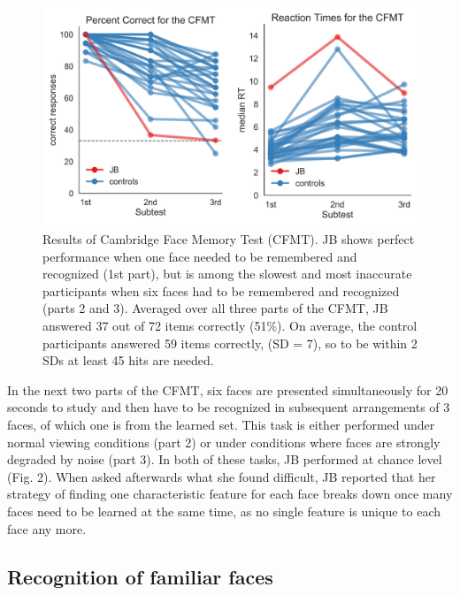 \documentclass[fleqn,10pt]{SelfArx} %
\begin{document}
\begin{figure}[htbp]
	\begin{minipage}{\textwidth}
		\renewcommand{\familydefault}{\sfdefault}\normalfont
		\centering
		\includegraphics[width=\columnwidth]{../reports/figures/cambridge_main_figure.png}
		\vspace*{-3mm}
		\caption{Results of Cambridge Face Memory Test (CFMT). JB shows perfect performance when one face needed to be remembered and recognized (1st part), but is among the slowest and most inaccurate participants when six faces had to be remembered and recognized (parts 2 and 3). Averaged over all three parts of the CFMT, JB answered 37 out of 72 items correctly (51\%). On average, the control participants answered 59 items correctly, (SD = 7), so to be within 2 SDs at least 45 hits are needed.}%
		\label{fig:cfmt}
	\end{minipage}
\end{figure}

In the next two parts of the CFMT, six faces are presented simultaneously for 20 seconds to study and then have to be recognized in subsequent arrangements of 3 faces, of which one is from the learned set. This task is either performed under normal viewing conditions (part 2) or under conditions where faces are strongly degraded by noise (part 3). In both of these tasks, JB performed at chance level (Fig. 2). When asked afterwards what she found difficult, JB reported that her strategy of finding one characteristic feature for each face breaks down once many faces need to be learned at the same time, as no single feature is unique to each face any more. 
 

\subsection*{Recognition of familiar faces}
\end{document}
